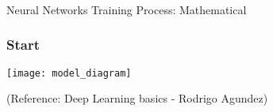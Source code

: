 



\begin{frame}[fragile]\frametitle{}
\begin{center}
{\Large Neural Networks Training Process: Mathematical}
\end{center}
\end{frame}

\begin{frame}[fragile] \frametitle{Start}

\begin{center}
\texttt{[image: model\_diagram]}

\end{center}

\tiny{(Reference: Deep Learning basics - Rodrigo Agundez)}

\end{frame}


